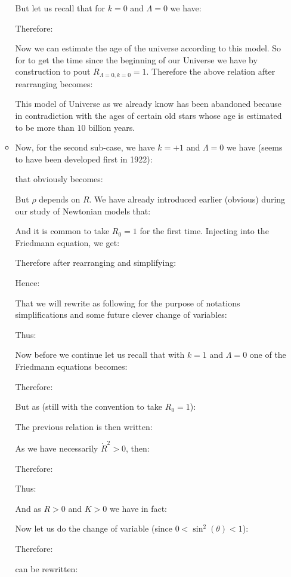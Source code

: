 \begin{itemize}
\begin{itemize}
				But let us recall that for $k=0$ and $\Lambda=0$ we have:
				
				Therefore:
				
				Now we can estimate the age of the universe according to this model. So for to get the time since the beginning of our Universe we have by construction to pout $R_{\Lambda=0,k=0}=1$. Therefore the above relation after rearranging becomes:
				
				This model of Universe as we already know has been abandoned because in contradiction with the ages of certain old stars whose age is estimated to be more than $10$ billion years.

				\item Now, for the second sub-case, we have $k=+1$ and $\Lambda=0$ we have (seems to have been developed first in 1922):
				
				that obviously becomes:
				
				But $\rho$ depends on $R$. We have already introduced earlier (obvious) during our study of Newtonian models that:
				
				And it is common to take $R_0=1$ for the first time. Injecting into the Friedmann equation, we get:
				
				Therefore after rearranging and simplifying:
				
				Hence:
				
				That we will rewrite as following for the purpose of notations simplifications and some future clever change of variables:
				
				Thus:
				
				Now before we continue let us recall that with $k=1$ and $\Lambda=0$ one of the Friedmann equations becomes:
				
				Therefore:
				
				But as (still with the convention to take $R_0=1$):
				
				The previous relation is then written:
				
				As we have necessarily $\dot{R}^2>0$, then:
				
				Therefore:
				
				Thus:
				
				And as $R>0$ and $K>0$ we have in fact:
				
				Now let us do the change of variable (since $0<\sin^2(\theta)<1$):
				
				Therefore:
				
				can be rewritten:
				

\end{itemize}
\end{itemize}
